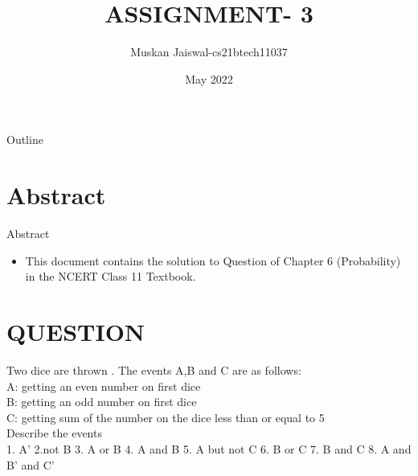 \documentclass{beamer}
\title{ASSIGNMENT- 3}
\author{Muskan Jaiswal-cs21btech11037}
\date{May 2022}
\begin{document}
\begin{frame}
		\titlepage
	\end{frame}

\begin{frame}{Outline}
  \tableofcontents
\end{frame}

\section{Abstract}
	\begin{frame}{Abstract}
		\begin{itemize}
			\item 	This document contains the solution to Question of Chapter 6 (Probability) in the NCERT Class 11 Textbook.
		\end{itemize}
	\end{frame}


\section{QUESTION}
\begin{frame}{}
\begin{block}{}


Two dice are thrown . The events A,B and C are as follows:\\
A: getting an even number on first dice\\
B: getting an odd number on first dice\\
C: getting sum of the number on the dice less than or equal to 5\\
Describe the events\\
1. A' 2.not B 3.  A or B  4. A and B 5. A but not C 6. B or C 7. B and C  8. A and B' and C'\\
\end{block}
\end{frame}
\end{document}
